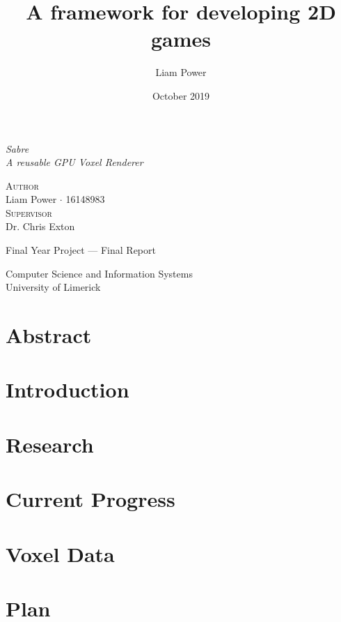 \documentclass[dvipsnames,12pt,a4paper]{report}
\title{\MakeUppercase A framework for developing 2D games}
\author{Liam Power}
\date{October 2019}
\begin{document}
\begin{titlepage}
   \begin{center}
    \vspace*{0.5cm}
   
    \vspace*{1cm}
    
   \textit{{\Huge Sabre}}\\
   \vspace{0.2cm}
   \textit{{\Large A reusable GPU Voxel Renderer}}\\

   \vspace{2.5cm}

   \textsc{{\Large Author}}\\
   \vspace{0.2cm}
   {\large Liam Power $\cdot$ 16148983} \\
   \vspace{1.5cm}
   \textsc{{\Large Supervisor}}\\
   \vspace{0.2cm}
   {\large Dr. Chris Exton} \\

   \vfill

  Final Year Project --- Final Report\\
   \vspace{0.8cm}

   Computer Science and Information Systems\\
   University of Limerick\\
 
   \end{center}
   \restoregeometry
\end{titlepage}

\tableofcontents

\chapter*{Abstract}


\chapter{Introduction}


\chapter{Research}


\chapter{Current Progress}


\chapter{Voxel Data}\label{chapter:voxel_data}




\chapter{Plan}


\printbibliography[title={References}]
\end{document}
